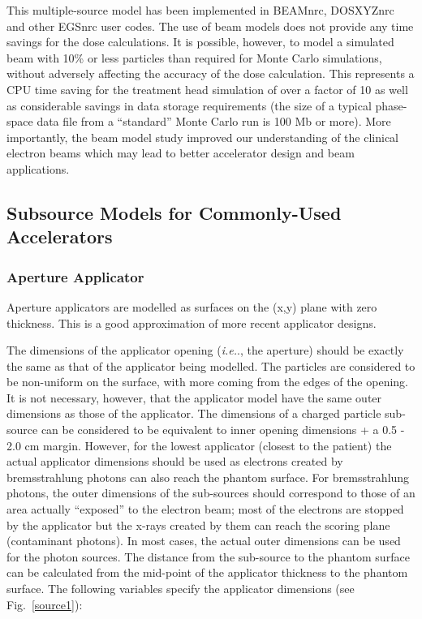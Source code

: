 \documentclass[12pt,twoside]{article}
\newcommand{\ie}{{\em i.e.}}
\begin{document}
This multiple-source model has been implemented in BEAMnrc, DOSXYZnrc and other EGSnrc
user codes. The use of beam models does not provide any time savings for the dose calculations. It is possible, however, to model a simulated beam with 10\% or less particles than required for Monte Carlo simulations, without adversely affecting the accuracy of the dose calculation. This represents a CPU time saving for the treatment head simulation of over a factor of 10 as well as considerable savings in data storage requirements (the size of a typical phase-space data file from a ``standard'' Monte Carlo run is 100 Mb or more).
More importantly, the beam model study improved our understanding of the clinical electron beams which may lead to better accelerator design and beam applications.


\subsection{Subsource Models for Commonly-Used Accelerators}
\subsubsection{Aperture Applicator}
Aperture applicators are modelled as surfaces on the (x,y) plane with zero thickness. This is a good approximation of more recent applicator designs.

The dimensions of the applicator opening (\ie., the aperture) should be exactly the same as that of the applicator being modelled. The particles are considered to be non-uniform on the surface, with more coming from the edges of the opening.
It is not necessary, however, that the applicator model have the same outer dimensions as those of the
applicator. The dimensions of a charged particle sub-source can be considered to be equivalent to inner opening dimensions + a 0.5 - 2.0 cm margin. However, for the lowest applicator (closest to the patient) the actual applicator dimensions should be used as electrons created by bremsstrahlung photons can also reach the phantom surface. For bremsstrahlung photons, the outer dimensions of the sub-sources should correspond to those of an area actually ``exposed'' to
the electron beam; most of the electrons are stopped by the applicator but the x-rays created by them can reach the scoring plane (contaminant photons). In most cases, the actual outer dimensions can be used for the photon sources. The distance from the sub-source to the phantom surface can be calculated from the mid-point of the applicator thickness to the phantom surface.
The following variables specify the applicator dimensions (see Fig.~\ref{source1}):
\end{document}
